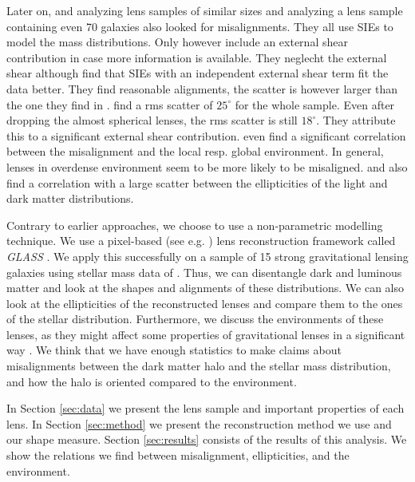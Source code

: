 \documentclass[10pt]{article}
\begin{document}
Later on, \cite{2006ApJ...649..599K} and \cite{2012ApJ...761..170G} analyzing lens samples of similar sizes and \cite{2009ApJ...690..670T} analyzing a lens sample containing even 70 galaxies also looked for misalignments. They all use SIEs to model the mass distributions. Only \cite{2012ApJ...761..170G} however include an external shear contribution in case more information is available. They neglecht the external shear although \cite{1998ApJ...509..561K} find that SIEs with an independent external shear term fit the data better. They find reasonable alignments, the scatter is however larger than the one they find in \cite{1997ApJ...482..604K}. \cite{2012ApJ...761..170G} find a rms scatter of $25^{\circ}$ for the whole sample. Even after dropping the almost spherical lenses, the rms scatter is still $18^{\circ}$. They attribute this to a significant external shear contribution. \cite{2009ApJ...690..670T} even find a significant correlation between the misalignment and the local resp. global environment. In general, lenses in overdense environment seem to be more likely to be misaligned. \cite{2009ApJ...690..670T} and \cite{2012ApJ...761..170G} also find a correlation with a large scatter between the ellipticities of the light and dark matter distributions.

Contrary to earlier approaches, we choose to use a non-parametric modelling technique. We use a pixel-based (see e.g. \cite{1997MNRAS.292..148S}) lens reconstruction framework called \textit{GLASS} \citep{2012MNRAS.425.3077L}. We apply this successfully on a sample of 15 strong gravitational lensing galaxies using stellar mass data of \cite{leier11phd}. Thus, we can disentangle dark and luminous matter and look at the shapes and alignments of these distributions. We can also look at the ellipticities of the reconstructed lenses and compare them to the ones of the stellar distribution. Furthermore, we discuss the environments of these lenses, as they might affect some properties of gravitational lenses in a significant way \citep{2006ApJ...641..169M,2011ApJ...726...84W}. We think that we have enough statistics to make claims about misalignments between the dark matter halo and the stellar mass distribution, and how the halo is oriented compared to the environment.

In Section \ref{sec:data} we present the lens sample and important properties of each lens. In Section \ref{sec:method} we present the reconstruction method we use and our shape measure. Section \ref{sec:results} consists of the results of this analysis. We show the relations we find between misalignment, ellipticities, and the environment.
\end{document}
